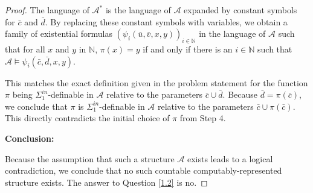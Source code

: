 \documentclass[12pt]{article}
\begin{document}
\begin{proof}
The language of $\mathcal{A}^*$ is the language of $\mathcal{A}$ expanded by constant symbols for $\bar{c}$ and $\bar{d}$. By replacing these constant symbols with variables, we obtain a family of existential formulas $(\psi_i(\bar{u}, \bar{v}, x, y))_{i \in \mathbb{N}}$ in the language of $\mathcal{A}$ such that for all $x$ and $y$ in $\mathbb{N}$, $\pi(x) = y$ if and only if there is an $i \in \mathbb{N}$ such that $\mathcal{A} \models \psi_i(\bar{c}, \bar{d}, x, y)$.

This matches the exact definition given in the problem statement for the function $\pi$ being $\Sigma^{in}_1$-definable in $\mathcal{A}$ relative to the parameters $\bar{c} \cup \bar{d}$. 
Because $\bar{d} = \pi(\bar{c})$, we conclude that $\pi$ is $\Sigma^{in}_1$-definable in $\mathcal{A}$ relative to the parameters $\bar{c} \cup \pi(\bar{c})$. 
This directly contradicts the initial choice of $\pi$ from Step 4. 

\textbf{Conclusion:}

Because the assumption that such a structure $\mathcal{A}$ exists leads to a logical contradiction, we conclude that no such countable computably-represented structure exists. The answer to Question \ref{1.2} is no.
\end{proof}
\end{document}
